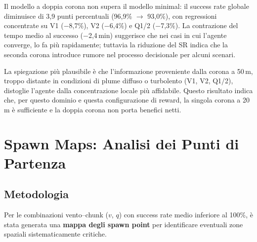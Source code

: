 \documentclass[12pt, a4paper]{article}
\begin{document}
Il modello a doppia corona non supera il modello minimal: il success rate globale
diminuisce di 3{,}9 punti percentuali (96{,}9\% $\to$ 93{,}0\%), con regressioni
concentrate su V1 ($-$8{,}7\%), V2 ($-$6{,}4\%) e Q1/2 ($-$7{,}3\%).
La contrazione del tempo medio al successo ($-$2{,}4\,min) suggerisce che nei casi
in cui l'agente converge, lo fa pi\`u rapidamente; tuttavia la riduzione del SR
indica che la seconda corona introduce rumore nel processo decisionale per alcuni
scenari.

La spiegazione pi\`u plausibile \`e che l'informazione proveniente dalla corona
a 50\,m, troppo distante in condizioni di plume diffuso o turbolento (V1, V2, Q1/2),
distoglie l'agente dalla concentrazione locale pi\`u affidabile.
Questo risultato indica che, per questo dominio e questa configurazione di reward,
la singola corona a 20\,m \`e sufficiente e la doppia corona non porta benefici netti.

\section{Spawn Maps: Analisi dei Punti di Partenza}

\subsection{Metodologia}

Per le combinazioni vento--chunk ($v$, $q$) con success rate medio inferiore al 100\%,
\`e stata generata una \textbf{mappa degli spawn point} per identificare eventuali
zone spaziali sistematicamente critiche.
\end{document}
